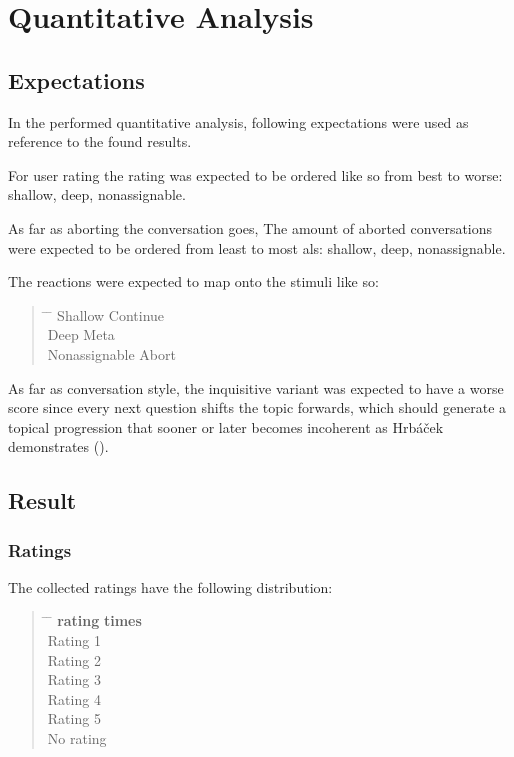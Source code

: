 \section{Quantitative Analysis}

\subsection{Expectations}

In the performed quantitative analysis,
following expectations were used as reference to the found results.

For user rating the rating was expected to be ordered like so from best to worse:
shallow, deep, nonassignable.

As far as aborting the conversation goes,
The amount of aborted conversations were expected to be ordered
from least to most als:
shallow, deep, nonassignable.

The reactions were expected to map onto the stimuli like so:

\begin{quote}
\begin{tabbing}
\hspace{4cm} \= \hspace{4cm} \= \kill %
Shallow \> Continue \\
Deep \> Meta \\
Nonassignable \> Abort \\
\end{tabbing}
\end{quote}

As far as conversation style, the inquisitive variant was expected to have a worse score
since every next question shifts the topic forwards, which should generate a topical progression
that sooner or later becomes incoherent as Hrbáček demonstrates ().

\subsection{Result}

\subsubsection{Ratings}

The collected ratings have the following distribution:

\begin{quote}
\begin{tabbing}
\hspace{4cm} \= \hspace{4cm} \= \kill %
\textbf{rating} \> \textbf{times} \\
Rating 1  \\
Rating 2  \\
Rating 3  \\
Rating 4  \\
Rating 5  \\
No rating  \\
\end{tabbing}
\end{quote}


